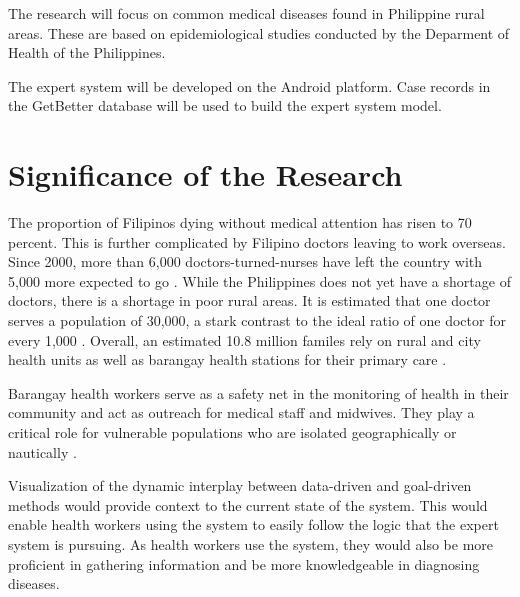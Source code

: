 The research will focus on common medical diseases found in Philippine rural areas. These are based on epidemiological studies conducted by the Deparment of Health of the Philippines.

The expert system will be developed on the Android platform. Case records in the GetBetter database will be used to build the expert system model. 

\section{Significance of the Research}
\label{sec:significance}

The proportion of Filipinos dying without medical attention has risen to 70 percent.
This is further complicated by Filipino doctors leaving to work overseas.
Since 2000, more than 6,000 doctors-turned-nurses have left the country with 5,000 more expected to go \cite{Harden:2008}.
While the Philippines does not yet have a shortage of doctors, there is a shortage in poor rural areas.
It is estimated that one doctor serves a population of 30,000, a stark contrast to the ideal ratio of one doctor for every 1,000 \cite{Manongdo:2014}.
Overall, an estimated 10.8 million familes rely on rural and city health units as well as barangay health stations for their primary care \cite{gmc:2013}.

Barangay health workers serve as a safety net in the monitoring of health in their community and act as outreach for medical staff and midwives.
They play a critical role for vulnerable populations who are isolated geographically or nautically \cite{DirectRelief:2014}.

Visualization of the dynamic interplay between data-driven and goal-driven methods would provide context to the current state of the system.
This would enable health workers using the system to easily follow the logic that the expert system is pursuing. 
As health workers use the system, they would also be more proficient in gathering information and be more knowledgeable in diagnosing diseases.
